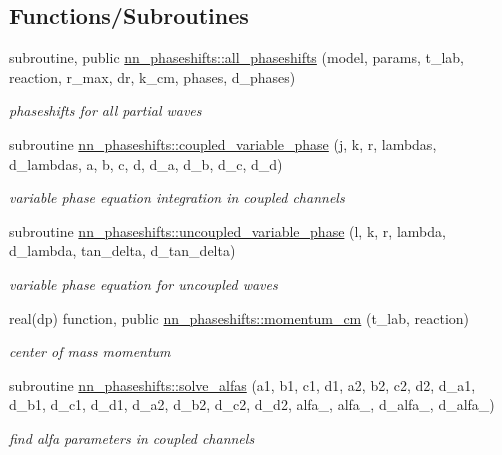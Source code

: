 \subsection*{Functions/\+Subroutines}
\begin{DoxyCompactItemize}
\item 
subroutine, public \hyperlink{namespacenn__phaseshifts_aaeeb14cbe1324015fe5d7bff37607bb0}{nn\+\_\+phaseshifts\+::all\+\_\+phaseshifts} (model, params, t\+\_\+lab, reaction, r\+\_\+max, dr, k\+\_\+cm, phases, d\+\_\+phases)
\begin{DoxyCompactList}\small\item\em phaseshifts for all partial waves \end{DoxyCompactList}\item 
subroutine \hyperlink{namespacenn__phaseshifts_a64b8d559b174ac865dfde5b7d067b5aa}{nn\+\_\+phaseshifts\+::coupled\+\_\+variable\+\_\+phase} (j, k, r, lambdas, d\+\_\+lambdas, a, b, c, d, d\+\_\+a, d\+\_\+b, d\+\_\+c, d\+\_\+d)
\begin{DoxyCompactList}\small\item\em variable phase equation integration in coupled channels \end{DoxyCompactList}\item 
subroutine \hyperlink{namespacenn__phaseshifts_a3af2de3d09433aeda72d9bf4f252ac9e}{nn\+\_\+phaseshifts\+::uncoupled\+\_\+variable\+\_\+phase} (l, k, r, lambda, d\+\_\+lambda, tan\+\_\+delta, d\+\_\+tan\+\_\+delta)
\begin{DoxyCompactList}\small\item\em variable phase equation for uncoupled waves \end{DoxyCompactList}\item 
real(dp) function, public \hyperlink{namespacenn__phaseshifts_a1d2c18032125ef6b75cc0170eb7c7cca}{nn\+\_\+phaseshifts\+::momentum\+\_\+cm} (t\+\_\+lab, reaction)
\begin{DoxyCompactList}\small\item\em center of mass momentum \end{DoxyCompactList}\item 
subroutine \hyperlink{namespacenn__phaseshifts_afbf7c7b1957246b291a52e9b125ef04e}{nn\+\_\+phaseshifts\+::solve\+\_\+alfas} (a1, b1, c1, d1, a2, b2, c2, d2, d\+\_\+a1, d\+\_\+b1, d\+\_\+c1, d\+\_\+d1, d\+\_\+a2, d\+\_\+b2, d\+\_\+c2, d\+\_\+d2, alfa\+\_, alfa\+\_, d\+\_\+alfa\+\_, d\+\_\+alfa\+\_)
\begin{DoxyCompactList}\small\item\em find alfa parameters in coupled channels \end{DoxyCompactList}\item 

\end{DoxyCompactItemize}
